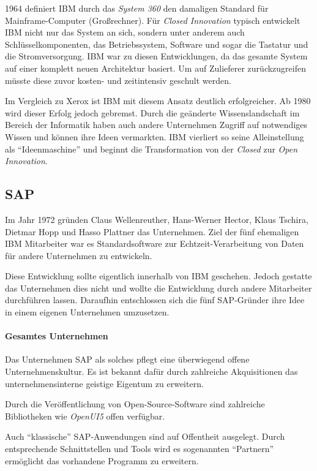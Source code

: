 1964 definiert IBM durch das \textit{System 360} den damaligen Standard für Mainframe-Computer (Großrechner).
Für \textit{Closed Innovation} typisch entwickelt IBM nicht nur das System an sich,
sondern unter anderem auch Schlüsselkomponenten, das Betriebssystem, Software und sogar die Tastatur und die Stromversorgung.
IBM war zu diesen Entwicklungen, da das gesamte System auf einer komplett neuen Architektur basiert.
Um auf Zulieferer zurückzugreifen müsste diese zuvor kosten- und zeitintensiv geschult werden.

Im Vergleich zu Xerox ist IBM mit diesem Ansatz deutlich erfolgreicher.
Ab 1980 wird dieser Erfolg jedoch gebremst.
Durch die geänderte Wissenslandschaft im Bereich der Informatik haben auch andere Unternehmen
Zugriff auf notwendiges Wissen und können ihre Ideen vermarkten.
IBM vierliert so seine Alleinstellung als \enquote{Ideenmaschine}
und beginnt die Transformation von der \textit{Closed} zur \textit{Open Innovation}.


\subsection{SAP}\label{sec:beispiele-sap}
Im Jahr 1972 gründen Claus Wellenreuther, Hans-Werner Hector, Klaus Tschira, Dietmar Hopp und Hasso Plattner das Unternehmen.
Ziel der fünf ehemaligen IBM Mitarbeiter war es
Standardsoftware zur Echtzeit-\linebreak Verarbeitung von Daten für andere Unternehmen zu entwickeln.

Diese Entwicklung sollte eigentlich innerhalb von IBM geschehen.
Jedoch gestatte das Unternehmen dies nicht und wollte die Entwicklung durch andere Mitarbeiter durchführen lassen.
Daraufhin entschlossen sich die fünf SAP-Gründer ihre Idee in einem eigenen Unternehmen umzusetzen. \cite{SAPCompa72:online}

\paragraph{Gesamtes Unternehmen}\label{sec:beispiele-sap-gesamt}
Das Unternehmen SAP als solches pflegt eine überwiegend offene Unternehmenskultur.
Es ist bekannt dafür durch zahlreiche Akquisitionen das unternehmensinterne geistige Eigentum zu erweitern.

Durch die Veröffentlichung von Open-Source-Software sind zahlreiche Bibliotheken wie \textit{OpenUI5} offen verfügbar.

Auch \enquote{klassische} SAP-Anwendungen sind auf Offentheit ausgelegt.
Durch entsprechende Schnittstellen und Tools wird es sogenannten \enquote{Partnern}
ermöglicht das vorhandene Programm zu erweitern.


